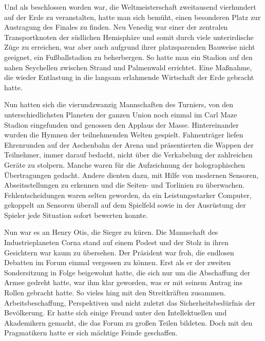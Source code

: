 \par

Und als beschlossen worden war, die Weltmeisterschaft zweitausend vierhundert auf der Erde zu veranstalten, hatte man sich bemüht, einen besonderen Platz zur Austragung des Finales zu finden. Neu Venedig war einer der zentralen Transportknoten der südlichen Hemisphäre und somit durch viele unterirdische Züge zu erreichen, war aber auch aufgrund ihrer platzsparenden Bauweise nicht geeignet, ein Fußballstadion zu beherbergen. So hatte man ein Stadion auf den nahen Seychellen zwischen Strand und Palmenwald errichtet. Eine Maßnahme, die wieder Entlastung in die langsam erlahmende Wirtschaft der Erde gebracht hatte.

\par

Nun hatten sich die vierundzwanzig Mannschaften des Turniers, von den unterschiedlichsten Planeten der ganzen Union noch einmal im Carl Maze Stadion eingefunden und genossen den Applaus der Masse. Hintereinander wurden die Hymnen der teilnehmenden Welten gespielt. Fahnenträger liefen Ehrenrunden auf der Aschenbahn der Arena und präsentierten die Wappen der Teilnehmer, immer darauf bedacht, nicht über die Verkabelung der zahlreichen Geräte zu stolpern. Manche waren für die Aufzeichnung der holographischen Übertragungen gedacht. Andere dienten dazu, mit Hilfe von modernen Sensoren, Abseitsstellungen zu erkennen und die Seiten- und Torlinien zu überwachen. Fehlentscheidungen waren selten geworden, da ein Leistungsstarker Computer, gekoppelt an Sensoren überall auf dem Spielfeld sowie in der Ausrüstung der Spieler jede Situation sofort bewerten konnte.

\par

Nun war es an Henry Otis, die Sieger zu küren. Die Mannschaft des Industrieplaneten Corna stand auf einem Podest und der Stolz in ihren Gesichtern war kaum zu übersehen. Der Präsident war froh, die endlosen Debatten im Forum einmal vergessen zu können. Erst als er der zweiten Sondersitzung in Folge beigewohnt hatte, die sich nur um die Abschaffung der Armee gedreht hatte, war ihm klar geworden, was er mit seinem Antrag ins Rollen gebracht hatte. So vieles hing mit den Streitkräften zusammen. Arbeitsbeschaffung, Perspektiven und nicht zuletzt das Sicherheitsbedürfnis der Bevölkerung. Er hatte sich einige Freund unter den Intellektuellen und Akademikern gemacht, die das Forum zu großen Teilen bildeten. Doch mit den Pragmatikern hatte er sich mächtige Feinde geschaffen.

